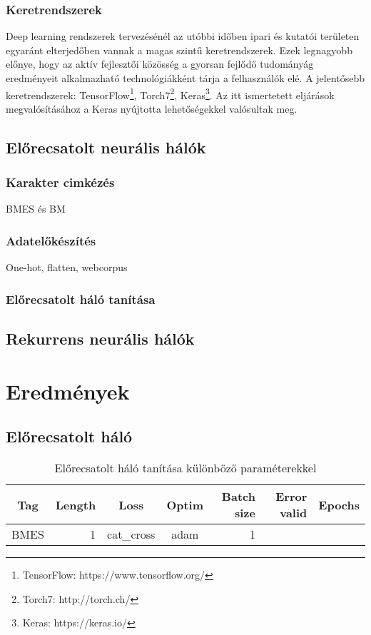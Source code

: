 \documentclass[a4paper, magyar]{article}
\begin{document}
\subsubsection{Keretrendszerek}
Deep learning rendszerek tervezésénél az utóbbi időben ipari és kutatói területen egyaránt elterjedőben vannak a magas szintű keretrendszerek. Ezek legnagyobb előnye, hogy az aktív fejlesztői közösség a gyorsan fejlődő tudományág eredményeit alkalmazható technológiákként tárja a felhasználók elé. A jelentősebb keretrendszerek: TensorFlow\footnote{TensorFlow: https://www.tensorflow.org/}, Torch7\footnote{Torch7: http://torch.ch/}, Keras\footnote{Keras: https://keras.io/}. Az itt ismertetett eljárások megvalósításához a Keras nyújtotta lehetőségekkel valósultak meg\cite{chollet2015keras}. 
\subsection{Előrecsatolt neurális hálók}
\subsubsection{Karakter cimkézés}
BMES és BM
\subsubsection{Adatelőkészítés}
One-hot, flatten, webcorpus
\subsubsection{Előrecsatolt háló tanítása}
\subsection{Rekurrens neurális hálók}
\section{Eredmények}
\subsection{Előrecsatolt háló}
\begin{table}[h]\centering
	\begin{tabular}{|c|r|c|c|r|r|r|}
		\hline
		Tag&Length&Loss&Optim&Batch size&Error valid&Epochs\\
		\hline
		BMES&1&cat\_cross&adam&1& & \\ 
		\hline
	\end{tabular}
	\caption{Előrecsatolt háló tanítása különböző paraméterekkel}
\end{table}


\end{document}
